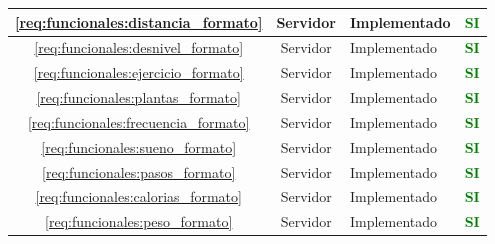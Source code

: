 \begin{xltabular}{\textwidth}{|c|c|X|c|}
        \hline
        \ref{req:funcionales:distancia_formato} & Servidor & Implementado & \textcolor{green}{\textbf{SI}} \\
        \hline
        \ref{req:funcionales:desnivel_formato} & Servidor & Implementado & \textcolor{green}{\textbf{SI}} \\
        \hline
        \ref{req:funcionales:ejercicio_formato} & Servidor & Implementado & \textcolor{green}{\textbf{SI}} \\
        \hline
        \ref{req:funcionales:plantas_formato} & Servidor & Implementado & \textcolor{green}{\textbf{SI}} \\
        \hline
        \ref{req:funcionales:frecuencia_formato} & Servidor & Implementado & \textcolor{green}{\textbf{SI}} \\
        \hline
        \ref{req:funcionales:sueno_formato} & Servidor & Implementado & \textcolor{green}{\textbf{SI}} \\
        \hline
        \ref{req:funcionales:pasos_formato} & Servidor & Implementado & \textcolor{green}{\textbf{SI}} \\
        \hline
        \ref{req:funcionales:calorias_formato} & Servidor & Implementado & \textcolor{green}{\textbf{SI}} \\
        \hline
        \ref{req:funcionales:peso_formato} & Servidor & Implementado & \textcolor{green}{\textbf{SI}} \\
    \end{xltabular}

